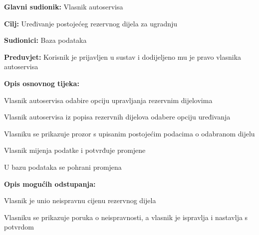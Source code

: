 \noindent {}
\begin{packed_item}

	\item \textbf{Glavni sudionik: } Vlasnik autoservisa
	\item  \textbf{Cilj:} Uređivanje postojećeg rezervnog dijela za ugradnju
	\item  \textbf{Sudionici:} Baza podataka
	\item  \textbf{Preduvjet:} Korisnik je prijavljen u sustav i dodijeljeno
	mu je pravo vlasnika autoservisa
	\item  \textbf{Opis osnovnog tijeka:}

	\item[] \begin{packed_enum}

		\item Vlasnik autoservisa odabire opciju upravljanja rezervnim dijelovima
		\item Vlasnik autoservisa iz popisa rezervnih dijelova odabere opciju
		uređivanja
		\item Vlasniku se prikazuje prozor s upisanim postojećim podacima o
		odabranom dijelu
		\item Vlasnik mijenja podatke i potvrđuje promjene
		\item U bazu podataka se pohrani promjena

	\end{packed_enum}

	\item  \textbf{Opis mogućih odstupanja:}
	\item[] \begin{packed_item}
		\item[4.a] Vlasnik je unio neispravnu cijenu rezervnog dijela
		\item[] \begin{packed_enum}
			\item Vlasniku se prikazuje poruka o neispravnosti, a vlasnik je
			ispravlja i nastavlja s potvrdom
		\end{packed_enum}
	\end{packed_item}

\end{packed_item}

